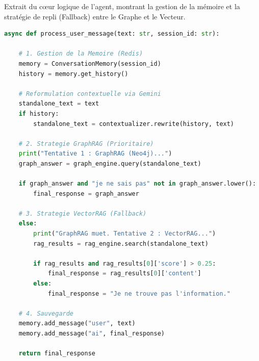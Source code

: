 \label{annexe:orchestrator}

Extrait du cœur logique de l'agent, montrant la gestion de la mémoire et la stratégie de repli (Fallback) entre le Graphe et le Vecteur.

\begin{lstlisting}[language=python, caption=Algorithme de décision (orchestrator.py - Extrait)]
async def process_user_message(text: str, session_id: str):
    
    # 1. Gestion de la Memoire (Redis)
    memory = ConversationMemory(session_id)
    history = memory.get_history()
    
    # Reformulation contextuelle via Gemini
    standalone_text = text
    if history:
        standalone_text = contextualizer.rewrite(history, text)

    # 2. Strategie GraphRAG (Prioritaire)
    print("Tentative 1 : GraphRAG (Neo4j)...")
    graph_answer = graph_engine.query(standalone_text)
    
    if graph_answer and "je ne sais pas" not in graph_answer.lower():
        final_response = graph_answer
    
    # 3. Strategie VectorRAG (Fallback)
    else:
        print("GraphRAG muet. Tentative 2 : VectorRAG...")
        rag_results = rag_engine.search(standalone_text)
        
        if rag_results and rag_results[0]['score'] > 0.25:
            final_response = rag_results[0]['content']
        else:
            final_response = "Je ne trouve pas l'information."

    # 4. Sauvegarde
    memory.add_message("user", text)
    memory.add_message("ai", final_response)
    
    return final_response
\end{lstlisting}
